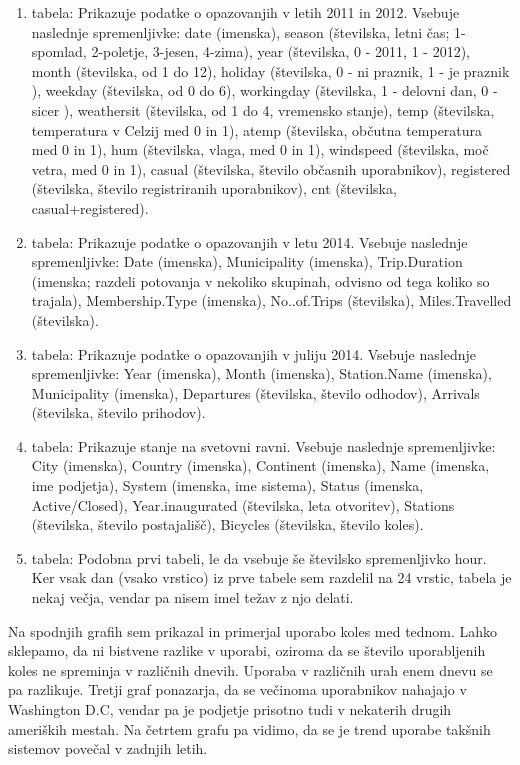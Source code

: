 \documentclass[11pt,a4paper]{article}
\begin{document}
\begin{enumerate}

\item{tabela: Prikazuje podatke o opazovanjih v letih 2011 in 2012. Vsebuje naslednje spremenljivke: date (imenska), season (številska, letni čas; 1-spomlad, 2-poletje, 3-jesen, 4-zima), year (številska, 0 - 2011, 1 - 2012), month (številska, od 1 do 12), holiday (številska, 0 - ni praznik, 1 - je praznik ), weekday (številska, od 0 do 6), workingday (številska, 1 - delovni dan, 0 - sicer ), weathersit (številska, od 1 do 4, vremensko stanje), temp (številska, temperatura v Celzij med 0 in 1), atemp (številska, občutna temperatura med 0 in 1), hum (številska, vlaga, med 0 in 1),	windspeed (številska, moč vetra, med 0 in 1),	casual (številska, število občasnih uporabnikov),	registered (številska, število registriranih uporabnikov),	cnt (številska, casual+registered).}

\item{tabela: Prikazuje podatke o opazovanjih v letu 2014. Vsebuje naslednje spremenljivke: Date (imenska), Municipality	(imenska), Trip.Duration (imenska; razdeli potovanja v nekoliko skupinah, odvisno od tega koliko so trajala),	Membership.Type (imenska),	No..of.Trips (številska),	Miles.Travelled (številska).}

\item{tabela: Prikazuje podatke o opazovanjih v juliju 2014. Vsebuje naslednje spremenljivke: Year (imenska), Month (imenska), Station.Name (imenska),	Municipality (imenska), Departures (številska, število odhodov),	Arrivals (številska, število prihodov).}

\item{tabela: Prikazuje stanje na svetovni ravni. Vsebuje naslednje spremenljivke:  City (imenska),	Country (imenska),	Continent (imenska), Name (imenska, ime podjetja),	System (imenska, ime sistema),	Status (imenska, Active/Closed),	Year.inaugurated (številska, leta otvoritev),	Stations (številska, število postajališč), Bicycles (številska, število koles).}

\item{tabela: Podobna prvi tabeli, le da vsebuje še številsko spremenljivko hour. Ker vsak dan (vsako vrstico) iz prve tabele sem razdelil na 24 vrstic, tabela je nekaj večja, vendar pa nisem imel težav z njo delati.}

\end{enumerate}

Na spodnjih grafih sem prikazal in primerjal uporabo koles med tednom. Lahko sklepamo, da ni bistvene razlike v uporabi, oziroma da se število uporabljenih koles ne spreminja v različnih dnevih. Uporaba v različnih urah enem dnevu se pa razlikuje. Tretji graf ponazarja, da se večinoma uporabnikov nahajajo v Washington D.C, vendar pa je podjetje prisotno tudi v nekaterih drugih ameriških mestah. Na četrtem grafu pa vidimo, da se je trend uporabe takšnih sistemov povečal v zadnjih letih.
\end{document}
